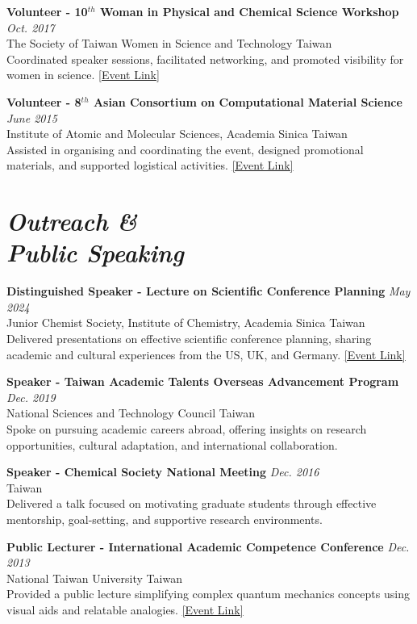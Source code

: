 {\bf Volunteer - 10$^{th}$ Woman in Physical and Chemical Science Workshop}
\hfill \textit{Oct. 2017} \\
The Society of Taiwan Women in Science and Technology \hfill Taiwan \\
Coordinated speaker sessions, facilitated networking, and promoted visibility for women in science.   \hfill \href{http://www.twepress.net/new/activity/item/213-activity-117-4}{[Event Link]}

{\bf Volunteer - 8$^{th}$  Asian Consortium on Computational Material Science}  \hfill \textit{June 2015} \\ 
Institute of Atomic and Molecular Sciences, Academia Sinica \hfill Taiwan \\
Assisted in organising and coordinating the event, designed promotional materials, and supported logistical activities. \hfill \href{https://www.iams.sinica.edu.tw/accms8/}{[Event Link]}

\section{\sl Outreach \& \\ Public Speaking}

{\bf Distinguished Speaker - Lecture on Scientific Conference Planning} \hfill \textit{May 2024}  \\
Junior Chemist Society, Institute of Chemistry, Academia Sinica \hfill Taiwan  \\
Delivered presentations on effective scientific conference planning, sharing academic and cultural experiences from the US, UK, and Germany. \hfill \href{https://www.facebook.com/share/p/15W3mzVk48/?mibextid=wwXIfr}{[Event Link]}

{\bf Speaker - Taiwan Academic Talents Overseas Advancement Program}
\hfill \textit{Dec. 2019} \\
National Sciences and Technology Council \hfill Taiwan  \\
Spoke on pursuing academic careers abroad, offering insights on research opportunities, cultural adaptation, and international collaboration.

{\bf Speaker - Chemical Society National Meeting}
\hfill \textit{Dec. 2016} \\
\null \hfill Taiwan  \\
Delivered a talk focused on motivating graduate students through effective mentorship, goal-setting, and supportive research environments.

{\bf  Public Lecturer - International Academic Competence Conference} \hfill \textit{Dec. 2013} \\
National Taiwan University \hfill Taiwan  \\
Provided a public lecture simplifying complex quantum mechanics concepts using visual aids and relatable analogies. \hfill \href{https://iac2013.weebly.com}{[Event Link]}

\endinput